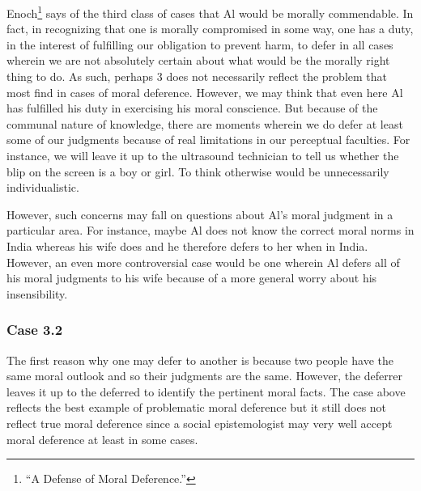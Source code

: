 \documentclass[phdthesis,12pt,final]{wuthesis}
\theoremstyle{definition}
\theoremstyle{definition}
\theoremstyle{definition}
\theoremstyle{definition}
\theoremstyle{remark}
\begin{document}
Enoch\footnote{{``A {Defense} of {Moral Deference}.''}} says of the third class of cases that Al would be morally commendable. In fact, in recognizing that one is morally compromised in some way, one has a duty, in the interest of fulfilling our obligation to prevent harm, to defer in all cases wherein we are not absolutely certain about what would be the morally right thing to do. As such, perhaps 3 does not necessarily reflect the problem that most find in cases of moral deference. However, we may think that even here Al has fulfilled his duty in exercising his moral conscience. But because of the communal nature of knowledge, there are moments wherein we do defer at least some of our judgments because of real limitations in our perceptual faculties. For instance, we will leave it up to the ultrasound technician to tell us whether the blip on the screen is a boy or girl. To think otherwise would be unnecessarily individualistic.

However, such concerns may fall on questions about Al's moral judgment in a particular area. For instance, maybe Al does not know the correct moral norms in India whereas his wife does and he therefore defers to her when in India. However, an even more controversial case would be one wherein Al defers all of his moral judgments to his wife because of a more general worry about his insensibility.

\subsubsection*{Case 3.2}\label{case-3.2}

The first reason why one may defer to another is because two people have the same moral outlook and so their judgments are the same. However, the deferrer leaves it up to the deferred to identify the pertinent moral facts. The case above reflects the best example of problematic moral deference but it still does not reflect true moral deference since a social epistemologist may very well accept moral deference at least in some cases.
\end{document}
